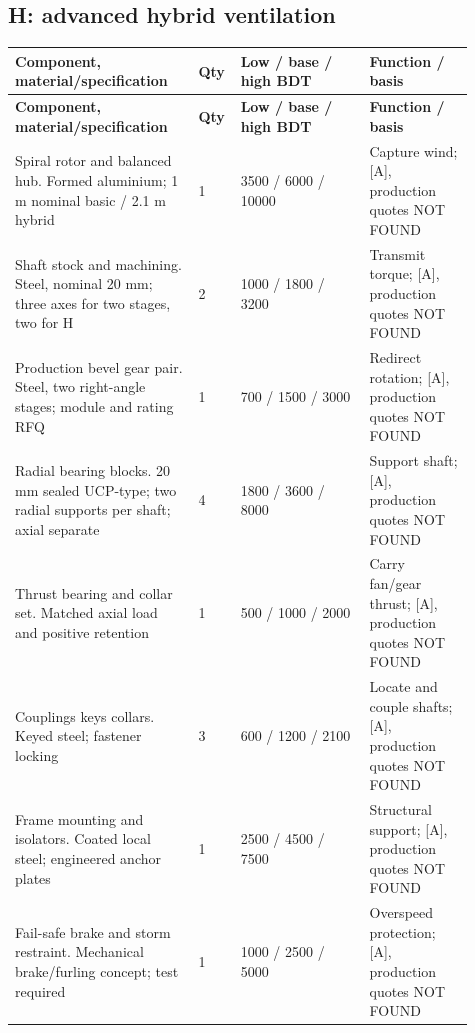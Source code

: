 \documentclass[11pt,a4paper]{article}
\begin{document}
\subsection{H: advanced hybrid ventilation}
{\footnotesize
\setlength{\tabcolsep}{3pt}\renewcommand{\arraystretch}{1.18}
\begin{longtable}{@{}>{\raggedright\arraybackslash}p{0.3784\linewidth}>{\raggedright\arraybackslash}p{0.0541\linewidth}>{\raggedright\arraybackslash}p{0.2613\linewidth}>{\raggedright\arraybackslash}p{0.2162\linewidth}@{}}
\toprule \textbf{Component, material/specification} & \textbf{Qty} & \textbf{Low / base / high BDT} & \textbf{Function / basis} \\ \midrule
\endfirsthead\toprule \textbf{Component, material/specification} & \textbf{Qty} & \textbf{Low / base / high BDT} & \textbf{Function / basis} \\ \midrule
\endhead\bottomrule\endfoot
Spiral rotor and balanced hub. Formed aluminium; 1 m nominal basic / 2.1 m hybrid & \num{1} & \num{3500} / \num{6000} / \num{10000} & Capture wind; [A], production quotes NOT FOUND \\
Shaft stock and machining. Steel, nominal 20 mm; three axes for two stages, two for H & \num{2} & \num{1000} / \num{1800} / \num{3200} & Transmit torque; [A], production quotes NOT FOUND \\
Production bevel gear pair. Steel, two right-angle stages; module and rating RFQ & \num{1} & \num{700} / \num{1500} / \num{3000} & Redirect rotation; [A], production quotes NOT FOUND \\
Radial bearing blocks. 20 mm sealed UCP-type; two radial supports per shaft; axial separate & \num{4} & \num{1800} / \num{3600} / \num{8000} & Support shaft; [A], production quotes NOT FOUND \\
Thrust bearing and collar set. Matched axial load and positive retention & \num{1} & \num{500} / \num{1000} / \num{2000} & Carry fan/gear thrust; [A], production quotes NOT FOUND \\
Couplings keys collars. Keyed steel; fastener locking & \num{3} & \num{600} / \num{1200} / \num{2100} & Locate and couple shafts; [A], production quotes NOT FOUND \\
Frame mounting and isolators. Coated local steel; engineered anchor plates & \num{1} & \num{2500} / \num{4500} / \num{7500} & Structural support; [A], production quotes NOT FOUND \\
Fail-safe brake and storm restraint. Mechanical brake/furling concept; test required & \num{1} & \num{1000} / \num{2500} / \num{5000} & Overspeed protection; [A], production quotes NOT FOUND \\

\end{longtable}}
\end{document}
